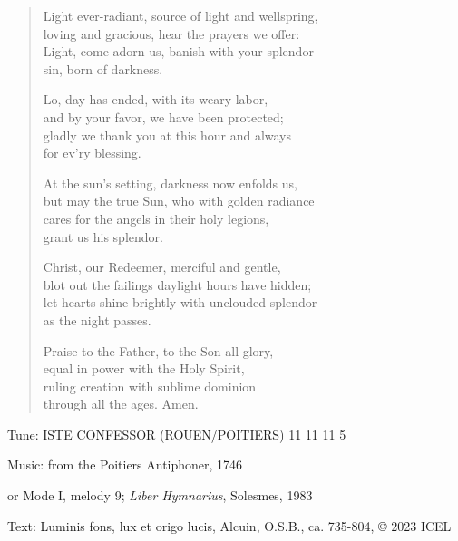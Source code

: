 \hymn

\begin{verse}
Light ever-radiant, source of light and wellspring,\\
loving and gracious, hear the prayers we offer:\\
Light, come adorn us, banish with your splendor\\
   sin, born of darkness.

Lo, day has ended, with its weary labor,\\
and by your favor, we have been protected;\\
gladly we thank you at this hour and always\\
   for ev’ry blessing.

At the sun’s setting, darkness now enfolds us,\\
but may the true Sun, who with golden radiance\\
cares for the angels in their holy legions,\\
   grant us his splendor.

Christ, our Redeemer, merciful and gentle,\\
blot out the failings daylight hours have hidden;\\
let hearts shine brightly with unclouded splendor\\
   as the night passes.

Praise to the Father, to the Son all glory,\\
equal in power with the Holy Spirit,\\
ruling creation with sublime dominion\\
   through all the ages. Amen.
\end{verse}

\begin{hymnsource}
Tune: ISTE CONFESSOR (ROUEN/POITIERS) 11 11 11 5

Music: from the Poitiers Antiphoner, 1746

or Mode I, melody 9; \emph{Liber Hymnarius}, Solesmes, 1983

Text: Luminis fons, lux et origo lucis, Alcuin, O.S.B., ca. 735-804, © 2023 ICEL
\end{hymnsource}